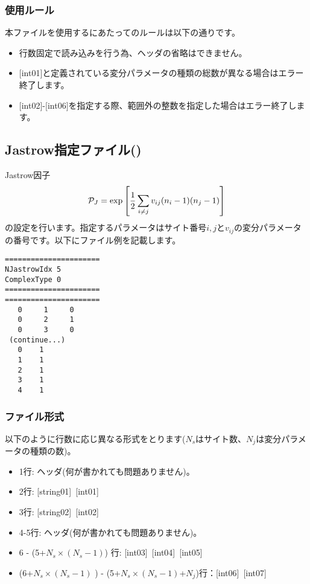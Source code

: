 \subsubsection{使用ルール}
本ファイルを使用するにあたってのルールは以下の通りです。
\begin{itemize}
\item 行数固定で読み込みを行う為、ヘッダの省略はできません。
\item $[$int01$]$と定義されている変分パラメータの種類の総数が異なる場合はエラー終了します。
\item $[$int02$]$-$[$int06$]$を指定する際、範囲外の整数を指定した場合はエラー終了します。
\end{itemize}

\newpage
\subsection{Jastrow指定ファイル()}
\label{Subsec:Jastrow}
Jastrow因子
\begin{equation}
{\cal P}_J=\exp\left[\frac{1}{2} \sum_{i\neq j} v_{ij} (n_i-1) (n_j-1)\right]
\end{equation}
の設定を行います。指定するパラメータはサイト番号$i, j$と$v_{ij}$の変分パラメータの番号です。以下にファイル例を記載します。

\begin{minipage}{12.5cm}
\begin{screen}
\begin{verbatim}
======================
NJastrowIdx 5  
ComplexType 0
====================== 
======================
   0     1     0 
   0     2     1 
   0     3     0 
 (continue...)
   0    1 
   1    1 
   2    1 
   3    1 
   4    1 
\end{verbatim}
\end{screen}
\end{minipage}

\subsubsection{ファイル形式}
以下のように行数に応じ異なる形式をとります($N_s$はサイト数、$N_j$は変分パラメータの種類の数)。
 \begin{itemize}
   \item  1行:  ヘッダ(何が書かれても問題ありません)。
   \item  2行:   [string01]~[int01]
   \item  3行:   [string02]~[int02]
   \item  4-5行:  ヘッダ(何が書かれても問題ありません)。
   \item  6 - (5+$N_s\times (N_s-1)$) 行: [int03]~[int04]~[int05]
   \item  (6+$N_s\times (N_s-1)$ ) - (5+$N_s\times (N_s-1)$+$N_j$)行：[int06]~[int07]
  \end{itemize}
